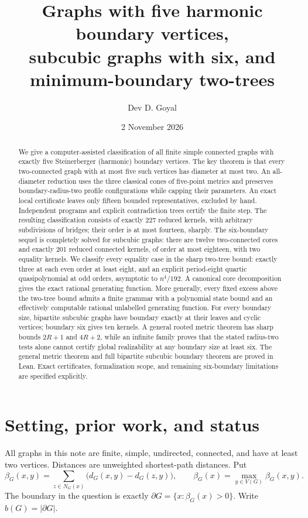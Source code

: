 \documentclass[11pt,a4paper]{article}
\title{Graphs with five harmonic boundary vertices,\\subcubic graphs with six, and minimum-boundary two-trees}
\author{Dev D. Goyal}
\date{2 November 2026}
\theoremstyle{definition}\newtheorem{definition}[theorem]{Definition}
\theoremstyle{remark}\newtheorem{remark}[theorem]{Remark}
\newcommand{\bd}{\partial}
\newcommand{\stab}{\beta}
\begin{document}
\maketitle
\begin{abstract}
We give a computer-assisted classification of all finite simple connected
graphs with exactly five Steinerberger (harmonic) boundary vertices.
The key theorem is that every two-connected graph with at most five such
vertices has diameter at most two. An all-diameter reduction uses the three
classical cones of five-point metrics and preserves boundary-radius-two
profile configurations while capping their parameters. An exact local
certificate leaves only fifteen bounded representatives, excluded by hand.
Independent programs and explicit contradiction trees certify the finite step.
The resulting classification consists of exactly 227 reduced kernels, with
arbitrary subdivisions of bridges; their order is at most fourteen, sharply.
The six-boundary sequel is completely solved for subcubic graphs: there
are twelve two-connected cores and exactly 201 reduced connected kernels,
of order at most eighteen, with two equality kernels. We classify every
equality case in the sharp two-tree bound: exactly three at each even order
at least eight, and an explicit period-eight quartic quasipolynomial at odd
orders, asymptotic to $n^4/192$. A canonical core decomposition gives the
exact rational generating function. More generally, every fixed excess
above the two-tree bound admits a finite grammar with a polynomial state
bound and an effectively computable rational unlabelled generating function.
For every boundary size, bipartite subcubic graphs have boundary
exactly at their leaves and cyclic vertices; boundary six gives ten kernels.
A general rooted metric theorem has sharp bounds $2R+1$ and $4R+2$,
while an infinite family proves that the stated radius-two tests alone
cannot certify global realizability at any boundary size at least six.
The general metric theorem and full bipartite subcubic boundary theorem are
proved in Lean. Exact certificates, formalization scope, and remaining
six-boundary limitations are specified explicitly.
\end{abstract}
\clearpage
\setcounter{tocdepth}{1}
\tableofcontents
\clearpage

\section{Setting, prior work, and status}
All graphs in this note are finite, simple, undirected, connected, and have at
least two vertices. Distances are unweighted shortest-path distances. Put
\[
 \stab_G(x,y)=\sum_{z\in N_G(x)}\bigl(d_G(x,y)-d_G(z,y)\bigr),\qquad
 \stab_G(x)=\max_{y\in V(G)}\stab_G(x,y).
\]
The boundary in the question is exactly
$\bd G=\{x:\stab_G(x)>0\}$. Write $b(G)=|\bd G|$.
\end{document}
